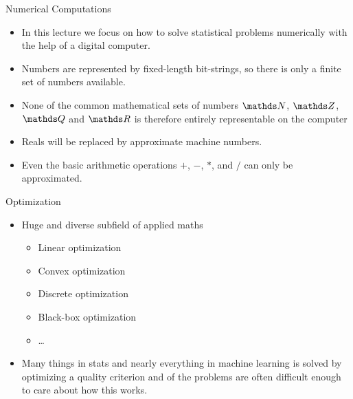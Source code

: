 \documentclass[11pt,compress,t,notes=noshow, xcolor=table]{beamer}
\begin{document}
\begin{vbframe}{Numerical Computations}

\begin{itemize}
\item In this lecture we focus on how to solve statistical problems numerically with the help of a digital computer.
\item Numbers are represented by fixed-length bit-strings, so there is only a finite set of numbers available.
\item None of the common mathematical sets of numbers $\N$, $\Z$, $\Q$
  and $\R$ is therefore entirely representable on the computer
\item Reals will be replaced by approximate machine numbers.
\item Even the basic arithmetic operations $+$, $-$, $*$, and $/$ can only be approximated.
\end{itemize}
\end{vbframe}

\begin{vbframe}{Optimization}

\begin{itemize}
  \item Huge and diverse subfield of applied maths
\begin{itemize}
  \item Linear optimization
  \item Convex optimization
  \item Discrete optimization
  \item Black-box optimization
  \item \ldots
\end{itemize}
  \item Many things in stats and nearly everything in machine learning is solved by optimizing
    a quality criterion and of the problems are often difficult enough to care about
    how this works.
\end{itemize}
\end{vbframe}



\end{document}
